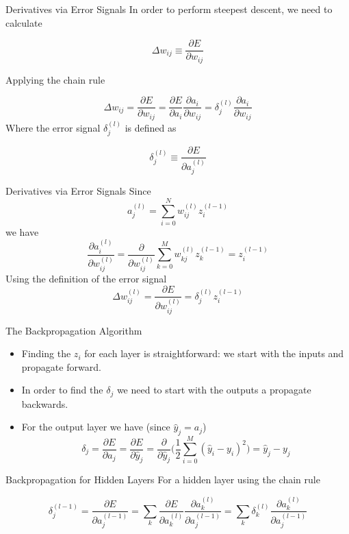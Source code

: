 \documentclass{beamer}
\begin{document}
\begin{frame}[fragile]{Derivatives via Error Signals}
In order to perform steepest descent, we need to calculate

$$
\Delta w_{ij} \equiv \frac{\partial E}{\partial w_{ij}}
$$

Applying the chain rule

$$
\Delta w_{ij} =
\frac{\partial E}{\partial w_{ij}} =
\frac{\partial E}{\partial a_i}\frac{\partial a_i}{\partial w_{ij}} =
\delta_j^{(l)}\frac{\partial a_i}{\partial w_{ij}}
$$
Where the error signal $\delta_j^{(l)}$ is defined as

$$
\delta_j^{(l)} \equiv
\frac{\partial E}{\partial a_j^{(l)}}
$$
\end{frame}

\begin{frame}[fragile]{Derivatives via Error Signals}
Since
$$
a_j^{(l)} = \sum_{i=0}^N w_{ij}^{(l)}z_i^{(l-1)}
$$
we have
$$
\frac{\partial a_i^{(l)}}{\partial w_{ij}^{(l)}} =
\frac{\partial}{\partial w_{ij}^{(l)}}\sum_{k=0}^M w_{kj}^{(l)}z_k^{(l-1)} =
z_i^{(l-1)}
$$
Using the definition of the error signal
$$
\Delta w_{ij}^{(l)} =
\frac{\partial E}{\partial w_{ij}^{(l)}} =
\delta_j^{(l)} z_i^{(l-1)}
$$
\end{frame}

\begin{frame}[fragile]{The Backpropagation Algorithm}
\begin{itemize}
\item
Finding the $z_i$ for each layer is straightforward: we start with the
inputs and propagate forward.
\item
In order to find the $\delta_j$ we need
to start with the outputs a propagate backwards.
\item
For the output layer we have (since $\hat{y}_j = a_j$)
$$
\delta_j = \frac{\partial E}{\partial a_j} = \frac{\partial E}{\partial \hat{y}_j} = \frac{\partial}{\partial \hat{y}_j}\bigg(\frac{1}{2}\sum_{i=0}^M (\hat{y}_i - y_i)^2\bigg) = \hat{y}_j - y_j
$$
\end{itemize}
\end{frame}

\begin{frame}[fragile]{Backpropagation for Hidden Layers}
For a hidden layer using the chain rule

$$
\delta_j^{(l-1)} = \frac{\partial E}{\partial a_j^{(l-1)}} =
\sum_k \frac{\partial E}{\partial a_k^{(l)}}\frac{\partial
  a_k^{(l)}}{\partial a_j^{(l-1)}} =
\sum_k \delta_k^{(l)}\frac{\partial a_k^{(l)}}{\partial a_j^{(l-1)}}
$$
\end{frame}
\end{document}
